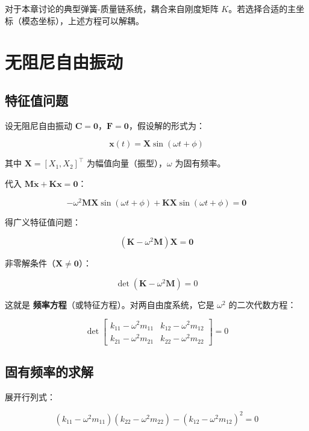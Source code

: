 对于本章讨论的典型弹簧-质量链系统，耦合来自刚度矩阵 $K$。若选择合适的主坐标（模态坐标），上述方程可以解耦。

\section{无阻尼自由振动}

\subsection{特征值问题}

设无阻尼自由振动 $\mathbf{C} = \mathbf{0}$，$\mathbf{F} = \mathbf{0}$，假设解的形式为：

\[
\mathbf{x}(t) = \mathbf{X} \sin(\omega t + \phi)
\]

其中 $\mathbf{X} = [X_1, X_2]^{\top}$ 为幅值向量（振型），$\omega$ 为固有频率。

代入 $\mathbf{M}\ddot{\mathbf{x}} + \mathbf{K}\mathbf{x} = \mathbf{0}$：

\[
-\omega^2 \mathbf{M}\mathbf{X} \sin(\omega t + \phi) + \mathbf{K}\mathbf{X} \sin(\omega t + \phi) = \mathbf{0}
\]

得广义特征值问题：

\begin{myformula}
\[
(\mathbf{K} - \omega^2 \mathbf{M}) \mathbf{X} = \mathbf{0}
\]
\end{myformula}

非零解条件（$\mathbf{X} \neq \mathbf{0}$）：

\begin{myformula}
\[
\det(\mathbf{K} - \omega^2 \mathbf{M}) = 0
\]
\end{myformula}

这就是 \textbf{频率方程}（或特征方程）。对两自由度系统，它是 $\omega^2$ 的二次代数方程：

\[
\det \begin{bmatrix}
k_{11} - \omega^2 m_{11} & k_{12} - \omega^2 m_{12} \\
k_{21} - \omega^2 m_{21} & k_{22} - \omega^2 m_{22}
\end{bmatrix} = 0
\]

\subsection{固有频率的求解}

展开行列式：

\[
(k_{11} - \omega^2 m_{11})(k_{22} - \omega^2 m_{22}) - (k_{12} - \omega^2 m_{12})^2 = 0
\]

